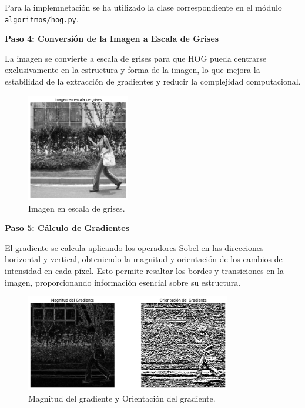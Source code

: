 \documentclass[a4paper]{article}
\begin{document}
Para la implemnetación se ha utilizado la clase correspondiente en el módulo \texttt{algoritmos/hog.py}.
\par\vspace{0.5cm}

\textbf{Paso 4: Conversión de la Imagen a Escala de Grises}
\par\vspace{0.5cm}

La imagen se convierte a escala de grises para que HOG pueda centrarse exclusivamente en la estructura y forma de la imagen, lo que mejora la estabilidad de la extracción de gradientes y reducir la complejidad computacional.

\begin{figure}[H]
    \centering
    \includegraphics[width=0.4\textwidth]{images/hog_paso_4.png}
    \caption{Imagen en escala de grises.}
\end{figure}

\textbf{Paso 5: Cálculo de Gradientes}
\par\vspace{0.5cm}

El gradiente se calcula aplicando los operadores Sobel en las direcciones horizontal y vertical, obteniendo la magnitud y orientación de los cambios de intensidad en cada píxel. Esto permite resaltar los bordes y transiciones en la imagen, proporcionando información esencial sobre su estructura.

\begin{figure}[H]
    \centering
    \includegraphics[width=0.8\textwidth]{images/hog_paso_5.png}
    \caption{Magnitud del gradiente y Orientación del gradiente.}
\end{figure}
\end{document}
